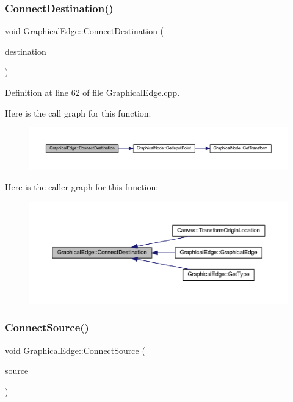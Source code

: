 \subsubsection{\texorpdfstring{Connect\+Destination()}{ConnectDestination()}}
{\footnotesize\ttfamily void Graphical\+Edge\+::\+Connect\+Destination (\begin{DoxyParamCaption}\item[{\hyperlink{class_graphical_node}{Graphical\+Node} $\ast$}]{destination }\end{DoxyParamCaption})}



Definition at line 62 of file Graphical\+Edge.\+cpp.

Here is the call graph for this function\+:
\nopagebreak
\begin{figure}[H]
\begin{center}
\leavevmode
\includegraphics[width=350pt]{class_graphical_edge_a41868fd50c413744e61a549f1cef6a79_cgraph}
\end{center}
\end{figure}
Here is the caller graph for this function\+:
\nopagebreak
\begin{figure}[H]
\begin{center}
\leavevmode
\includegraphics[width=350pt]{class_graphical_edge_a41868fd50c413744e61a549f1cef6a79_icgraph}
\end{center}
\end{figure}
\mbox{\label{class_graphical_edge_a9f2e7f370705c390ad67f5b18ed80a00}} 
\subsubsection{\texorpdfstring{Connect\+Source()}{ConnectSource()}}
{\footnotesize\ttfamily void Graphical\+Edge\+::\+Connect\+Source (\begin{DoxyParamCaption}\item[{\hyperlink{class_graphical_node}{Graphical\+Node} $\ast$}]{source }\end{DoxyParamCaption})}




